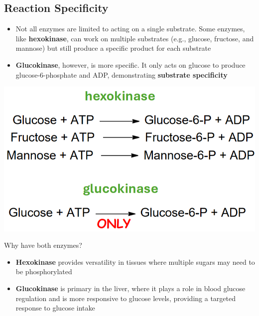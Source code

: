 \documentclass[10pt]{article}
\begin{document}
\subsection*{Reaction Specificity}
\begin{itemize}
    \item Not all enzymes are limited to acting on a single substrate.  Some enzymes, like \textbf{hexokinase}, can work on multiple substrates (e.g., glucose, fructose, and mannose) but still produce a specific product for each substrate
    \item \textbf{Glucokinase}, however, is more specific.  It only acts on glucose to produce glucose-6-phosphate and ADP, demonstrating \textbf{substrate specificity}
\end{itemize}
\begin{center}
    \includegraphics*[scale=0.6]{L1_15.png}
\end{center}
Why have both enzymes?
\begin{itemize}
    \item \textbf{Hexokinase} provides versatility in tissues where multiple sugars may need to be phosphorylated
    \item \textbf{Glucokinase} is primary in the liver, where it plays a role in blood glucose regulation and is more responsive to glucose levels, providing a targeted response to glucose intake
\end{itemize}
\end{document}
